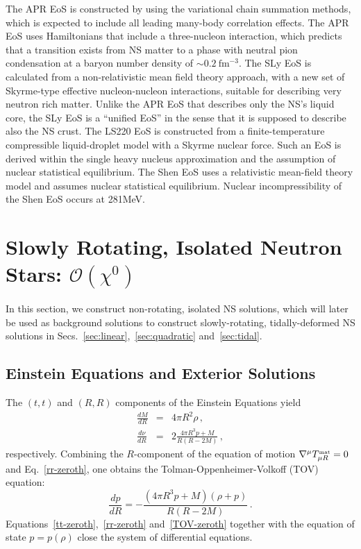 \documentclass[aps,twocolumn,nofootinbib,showpacs,superscriptaddress,hyperref]{revtex4-1}
\newcommand\be{\begin{equation}}
\newcommand\ba{\begin{eqnarray}}
\newcommand\ee{\end{equation}}
\newcommand\ea{\end{eqnarray}}
\newcommand{\MAT}{{\mbox{\tiny mat}}}
\newcommand{\mrm}{\mathrm}
\begin{document}
The APR EoS is constructed by using the variational chain summation methods, which is expected to include all leading many-body correlation effects. The APR EoS uses Hamiltonians that include a three-nucleon interaction, which predicts that a transition exists from NS matter to a phase with neutral pion condensation at a baryon number density of $\sim 0.2 \ \mrm{fm^{-3}}$. The SLy EoS is calculated from a non-relativistic mean field theory approach, with a new set of Skyrme-type effective nucleon-nucleon interactions, suitable for describing very neutron rich matter. Unlike the APR EoS that describes only the NS's liquid core, the SLy EoS is a ``unified EoS'' in the sense that it is supposed to describe also the NS crust. The LS220 EoS is constructed from a finite-temperature compressible liquid-droplet model with a Skyrme nuclear force. Such an EoS is derived within the single heavy nucleus approximation and the assumption of nuclear statistical equilibrium. The Shen EoS uses a relativistic mean-field theory model and assumes nuclear statistical equilibrium. Nuclear incompressibility of the Shen EoS occurs at 281MeV. 


\section{Slowly Rotating, Isolated Neutron Stars: $\mathcal{O}(\chi^0)$}
\label{sec:zeroth}

In this section, we construct non-rotating, isolated NS solutions, which will later be used as background solutions to construct slowly-rotating, tidally-deformed NS solutions in Secs.~\ref{sec:linear},~\ref{sec:quadratic} and~\ref{sec:tidal}.

\subsection{Einstein Equations and Exterior Solutions}

The $(t,t)$ and $(R,R)$ components of the Einstein Equations yield
%
\ba
\label{tt-zeroth}
\frac{d M}{dR} &=& 4 \pi R^2 \rho\,, \\
\label{rr-zeroth}
\frac{d \nu}{dR} &=& 2\frac{4 \pi R^3 p + M}{R(R-2M)}\,,
\ea
%
respectively. Combining the $R$-component of the equation of motion $\nabla^\mu T_{\mu R}^\MAT=0$ and Eq.~\eqref{rr-zeroth}, one obtains the Tolman-Oppenheimer-Volkoff (TOV) equation:
%
\be
\frac{dp}{dR} = -\frac{(4\pi R^3 p + M) (\rho + p)}{R(R-2M)}\,.
\label{TOV-zeroth}
\ee
%
Equations~\eqref{tt-zeroth},~\eqref{rr-zeroth} and~\eqref{TOV-zeroth} together with the equation of state $p=p(\rho)$ close the system of differential equations.
\end{document}
